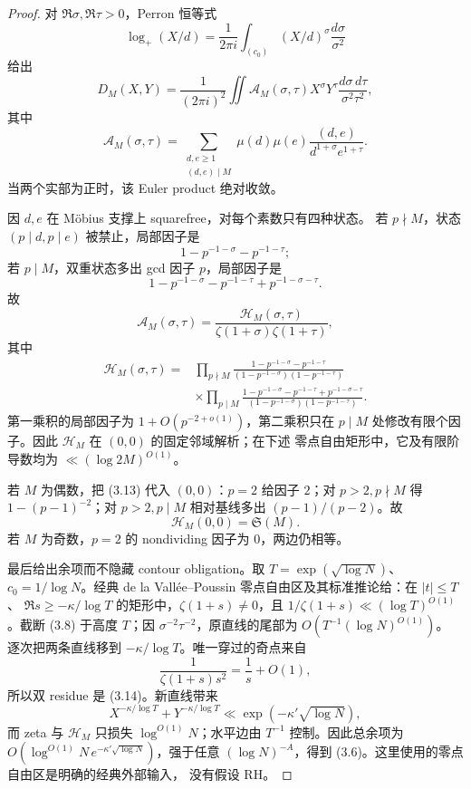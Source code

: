 \documentclass[11pt,a4paper]{ctexart}
\theoremstyle{definition}
\newcommand{\1}{\mathbf 1}
\begin{document}
\begin{proof}
对 $\Re\sigma,\Re\tau>0$，Perron 恒等式
\[
\log_+(X/d)=\frac1{2\pi i}\int_{(c_0)}(X/d)^\sigma
\frac{d\sigma}{\sigma^2}                               \tag{3.7}
\]
给出
\[
D_M(X,Y)=\frac1{(2\pi i)^2}\iint
\mathcal A_M(\sigma,\tau)X^\sigma Y^\tau
\frac{d\sigma\,d\tau}{\sigma^2\tau^2},               \tag{3.8}
\]
其中
\[
\mathcal A_M(\sigma,\tau)=
\sum_{\substack{d,e\ge1\\(d,e)\mid M}}\mu(d)\mu(e)
\frac{(d,e)}{d^{1+\sigma}e^{1+\tau}}.                  \tag{3.9}
\]
当两个实部为正时，该 Euler product 绝对收敛。

因 $d,e$ 在 Möbius 支撑上 squarefree，对每个素数只有四种状态。
若 $p\nmid M$，状态 $(p\mid d,p\mid e)$ 被禁止，局部因子是
\[
1-p^{-1-\sigma}-p^{-1-\tau};                            \tag{3.10}
\]
若 $p\mid M$，双重状态多出 gcd 因子 $p$，局部因子是
\[
1-p^{-1-\sigma}-p^{-1-\tau}+p^{-1-\sigma-\tau}.        \tag{3.11}
\]
故
\[
\mathcal A_M(\sigma,\tau)
=\frac{\mathcal H_M(\sigma,\tau)}
{\zeta(1+\sigma)\zeta(1+\tau)},                        \tag{3.12}
\]
其中
\begin{align*}
\mathcal H_M(\sigma,\tau)
={}&\prod_{p\nmid M}
\frac{1-p^{-1-\sigma}-p^{-1-\tau}}
{(1-p^{-1-\sigma})(1-p^{-1-\tau})}\\
&\times\prod_{p\mid M}
\frac{1-p^{-1-\sigma}-p^{-1-\tau}+p^{-1-\sigma-\tau}}
{(1-p^{-1-\sigma})(1-p^{-1-\tau})}.                    \tag{3.13}
\end{align*}
第一乘积的局部因子为 $1+O(p^{-2+o(1)})$，第二乘积只在 $p\mid M$
处修改有限个因子。因此 $\mathcal H_M$ 在 $(0,0)$ 的固定邻域解析；在下述
零点自由矩形中，它及有限阶导数均为 $\ll(\log 2M)^{O(1)}$。

若 $M$ 为偶数，把 (3.13) 代入 $(0,0)$：$p=2$ 给因子 $2$；对
$p>2,p\nmid M$ 得 $1-(p-1)^{-2}$；对 $p>2,p\mid M$ 相对基线多出
$(p-1)/(p-2)$。故
\[
\mathcal H_M(0,0)=\mathfrak S(M).                       \tag{3.14}
\]
若 $M$ 为奇数，$p=2$ 的 nondividing 因子为 $0$，两边仍相等。

最后给出余项而不隐藏 contour obligation。取
$T=\exp(\sqrt{\log N})$、$c_0=1/\log N$。经典 de la Vall\'ee--Poussin
零点自由区及其标准推论给：在 $|t|\le T$、
$\Re s\ge-\kappa/\log T$ 的矩形中，$\zeta(1+s)\ne0$，且
$1/\zeta(1+s)\ll(\log T)^{O(1)}$。截断 (3.8) 于高度 $T$；因
$\sigma^{-2}\tau^{-2}$，原直线的尾部为 $O(T^{-1}(\log N)^{O(1)})$。
逐次把两条直线移到 $-\kappa/\log T$。唯一穿过的奇点来自
\[
\frac1{\zeta(1+s)s^2}=\frac1s+O(1),                    \tag{3.15}
\]
所以双 residue 是 (3.14)。新直线带来
\[
X^{-\kappa/\log T}+Y^{-\kappa/\log T}
\ll\exp(-\kappa'\sqrt{\log N}),                        \tag{3.16}
\]
而 zeta 与 $\mathcal H_M$ 只损失 $\log^{O(1)}N$；水平边由
$T^{-1}$ 控制。因此总余项为
$O(\log^{O(1)}N\,e^{-\kappa'\sqrt{\log N}})$，强于任意
$(\log N)^{-A}$，得到 (3.6)。这里使用的零点自由区是明确的经典外部输入，
没有假设 RH。
\end{proof}
\end{document}
